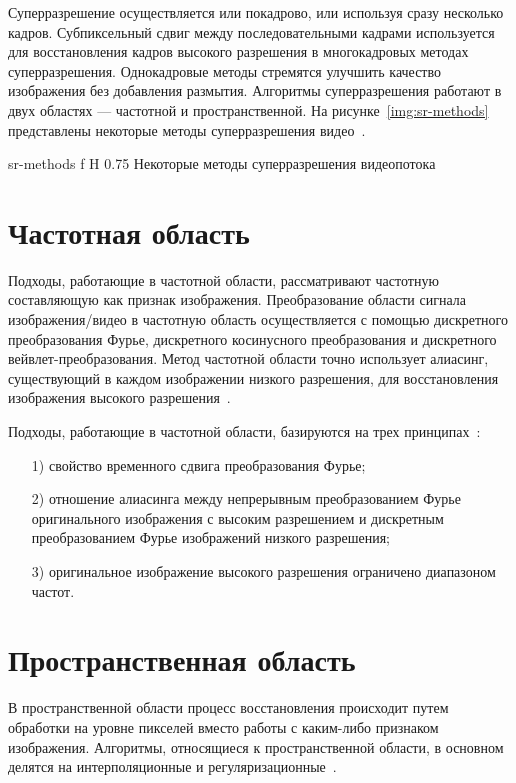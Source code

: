 \documentclass{bmstu}
\begin{document}
Суперразрешение осуществляется или покадрово, или используя сразу несколько кадров. 
Субпиксельный сдвиг между последовательными кадрами используется для восстановления кадров высокого разрешения в многокадровых методах суперразрешения. 
Однокадровые методы стремятся улучшить качество изображения без добавления размытия. 
Алгоритмы суперразрешения работают в двух областях --- частотной и пространственной. 
На рисунке~\ref{img:sr-methods} представлены некоторые методы суперразрешения видео~\cite{Daithankar2021}.

    {sr-methods}
    {f}
    {H}
    {0.75\textwidth}
    {Некоторые методы суперразрешения видеопотока~\cite{Daithankar2021}}

\section{Частотная область}

Подходы, работающие в частотной области, рассматривают частотную составляющую как признак изображения. 
Преобразование области сигнала изображения/видео в частотную область осуществляется с помощью дискретного преобразования Фурье, дискретного косинусного преобразования и дискретного вейвлет-преобразования. 
Метод частотной области точно использует алиасинг, существующий в каждом изображении низкого разрешения, для восстановления изображения высокого разрешения~\cite{Daithankar2021}.

Подходы, работающие в частотной области, базируются на трех принципах~\cite{Thapa2016}:
\begin{enumerate}
\item[1)] свойство временного сдвига преобразования Фурье;
\item[2)] отношение алиасинга между непрерывным преобразованием Фурье оригинального изображения с высоким разрешением и дискретным преобразованием Фурье изображений низкого разрешения;
\item[3)] оригинальное изображение высокого разрешения ограничено диапазоном частот.
\end{enumerate}

\section{Пространственная область}

В пространственной области процесс восстановления происходит путем обработки на уровне пикселей вместо работы с каким-либо признаком изображения. 
Алгоритмы, относящиеся к пространственной области, в основном делятся на интерполяционные и регуляризационные~\cite{Daithankar2021}.
\end{document}
